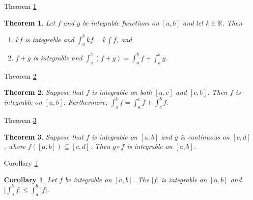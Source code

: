 \documentclass[avery5371,grid]{flashcards}
\newtheorem{corollary}{Corollary}
\newtheorem{theorem}{Theorem}
\newcommand{\bb}[1]{\mathbb{#1}}
\newcommand{\R}{\bb{R}}
\begin{document}
\begin{flashcard}[Theorem]{Theorem \ref{thm99}}
\begin{theorem}
\label{thm99}
Let $f$ and $g$ be integrable functions on $[a,b]$ and let $k \in \R$. 
 Then
\begin{enumerate}
\item[(a)]  $kf$ is integrable and $\int _a ^b {kf} = k\int{f}$, and 
\item[(b)]  $f+g$ is integrable and $\int _a ^b {(f+g)} =
\int _a ^b {f} + \int _a ^b {g}$.
\end{enumerate}
\end{theorem}
\end{flashcard}

\begin{flashcard}[Theorem]{Theorem \ref{thm100}}
\begin{theorem}
\label{thm100}
Suppose that $f$ is integrable on both $[a,c]$ and $[c,b]$.  Then $f$ is
integrable on $[a,b]$.  Furthermore, $\int _a ^b {f} =
\int _a ^c {f} + \int _c ^b {f}$.
\end{theorem}
\end{flashcard}

\begin{flashcard}[Theorem]{Theorem \ref{thm101}}
\begin{theorem}
\label{thm101}
Suppose that $f$ is integrable on $[a,b]$ and $g$ is continuous on
$[c,d]$, where $f([a,b]) \subseteq [c,d]$.  Then $g \circ f$ is
integrable on $[a,b]$.
\end{theorem}
\end{flashcard}

\begin{flashcard}[Corollary]{Corollary \ref{cor07}}
\begin{corollary}
\label{cor07}
Let $f$ be integrable on $[a,b]$.  The $|f|$ is integrable on $[a,b]$
and $\displaystyle \Big| \int _a ^b {f} \Big| \leq \int _a ^b {|f|}.$
\end{corollary}
\end{flashcard}
\end{document}
